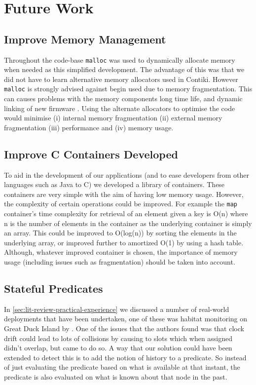 \section{Future Work}

\subsection{Improve Memory Management}

Throughout the code-base \verb|malloc| was used to dynamically allocate memory when needed as this simplified development. The advantage of this was that we did not have to learn alternative memory allocators used in Contiki. However \verb|malloc| is strongly advised against begin used due to memory fragmentation. This can causes problems with the memory components long time life, and dynamic linking of new firmware \cite{Dai:2004:EEL:1031495.1031516,Dunkels:2006:RDL:1182807.1182810}. Using the alternate allocators to optimise the code would minimise (i) internal memory fragmentation (ii) external memory fragmentation (iii) performance and (iv) memory usage.

\subsection{Improve C Containers Developed}

To aid in the development of our applications (and to ease developers from other languages such as Java to C) we developed a library of containers. These containers are very simple with the aim of having low memory usage. However, the complexity of certain operations could be improved. For example the \verb|map| container's time complexity for retrieval of an element given a key is O(n) where n is the number of elements in the container as the underlying container is simply an array. This could be improved to O(log(n)) by sorting the elements in the underlying array, or improved further to amortized O(1) by using a hash table. Although, whatever improved container is chosen, the importance of memory usage (including issues such as fragmentation) should be taken into account.

\subsection{Stateful Predicates}

In \autoref{sec:lit-review-practical-experience} we discussed a number of real-world deployments that have been undertaken, one of these was habitat monitoring on Great Duck Island by \citeauthor{SzewczykPMC04}. One of the issues that the authors found was that clock drift could lead to lots of collisions by causing to slots which when assigned didn't overlap, but came to do so. A way that our solution could have been extended to detect this is to add the notion of history to a predicate. So instead of just evaluating the predicate based on what is available at that instant, the predicate is also evaluated on what is known about that node in the past.

